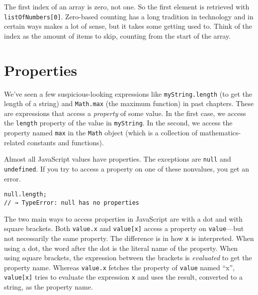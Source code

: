 \label{data.array_indexing}The first index of an array is zero, not one. So the first element is retrieved with \lstinline`listOfNumbers[0]`. Zero-based counting has a long tradition in technology and in certain ways makes a lot of sense, but it takes some getting used to. Think of the index as the amount of items to skip, counting from the start of the array.

\label{data.properties}\section{Properties}

We've seen a few suspicious-looking expressions like \lstinline`myString.length` (to get the length of a string) and \lstinline`Math.max` (the maximum function) in past chapters. These are expressions that access a \emph{property} of some value. In the first case, we access the \lstinline`length` property of the value in \lstinline`myString`. In the second, we access the property named \lstinline`max` in the \lstinline`Math` object (which is a collection of mathematics-related constants and functions).

Almost all JavaScript values have properties. The exceptions are \lstinline`null` and \lstinline`undefined`. If you try to access a property on one of these nonvalues, you get an error.

\begin{lstlisting}
null.length;
// → TypeError: null has no properties
\end{lstlisting}
\noindent{}

The two main ways to access properties in JavaScript are with a dot and with square brackets. Both \lstinline`value.x` and \lstinline`value[x]` access a property on \lstinline`value`—but not necessarily the same property. The difference is in how \lstinline`x` is interpreted. When using a dot, the word after the dot is the literal name of the property. When using square brackets, the expression between the brackets is \emph{evaluated} to get the property name. Whereas \lstinline`value.x` fetches the property of \lstinline`value` named ``x'', \lstinline`value[x]` tries to evaluate the expression \lstinline`x` and uses the result, converted to a string, as the property name.


